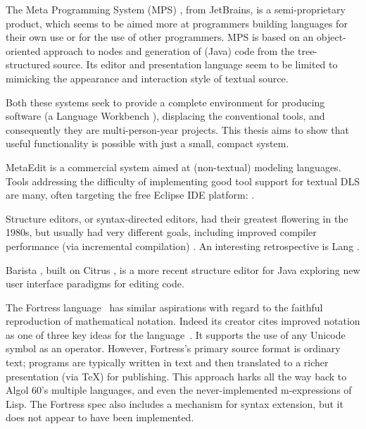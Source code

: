 The Meta Programming System (MPS) \cite{mps}, from JetBrains, is a semi-proprietary product, which seems to be aimed more at programmers building languages for their own use or for the use of other programmers. MPS is based on an object-oriented approach to nodes and generation of (Java) code from the tree-structured source. Its editor and presentation language seem to be limited to mimicking the appearance and interaction style of textual source.

Both these systems seek to provide a complete environment for producing software (a Language Workbench \cite{workbench}), displacing the conventional tools, and consequently they are multi-person-year projects. This thesis aims to show that useful functionality is possible with just a small, compact system.

MetaEdit \cite{metaedit} is a commercial system aimed at (non-textual) modeling languages. Tools addressing the difficulty of implementing good tool support for textual DLS are many, often targeting the free Eclipse IDE platform: \cite{xtext}\cite{spoofax}\cite{stratego}. 

Structure editors, or syntax-directed editors, had their greatest flowering in the 1980s, but usually had very different goals, including improved compiler performance (via incremental compilation) \cite{cps}\cite{zavodnik}. An interesting retrospective is Lang \cite{lang}.

Barista \cite{barista}, built on Citrus \cite{citrus}, is a more recent structure editor for Java exploring new user interface paradigms for editing code.

The Fortress language~\cite{fortress} has similar aspirations with regard to the faithful reproduction of mathematical notation. Indeed its creator cites improved notation as one of three key ideas for the language~\cite{fortress-parallel}. It supports the use of any Unicode~\cite{unicode} symbol as an operator. However, Fortress's primary source format is ordinary text; programs are typically written in text and then translated to a richer presentation (via \TeX) for publishing. This approach harks all the way back to Algol 60's multiple languages, and even the never-implemented m-expressions of Lisp. The Fortress spec also includes a mechanism for syntax extension, but it does not appear to have been implemented.



